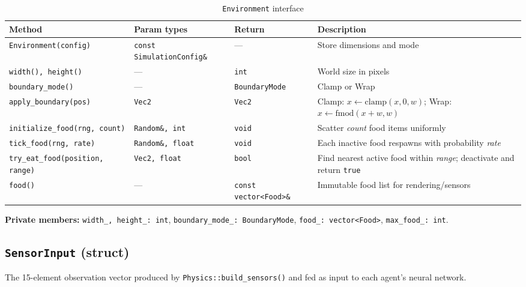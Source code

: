 \begin{table}[H]
\centering\small
\caption{\texttt{Environment} interface}
\begin{tabularx}{\textwidth}{@{}lllX@{}}
\toprule
\textbf{Method} & \textbf{Param types} & \textbf{Return} & \textbf{Description} \\
\midrule
\texttt{Environment(config)} & \texttt{const SimulationConfig\&} & — & Store dimensions and mode \\
\texttt{width(), height()} & — & \texttt{int} & World size in pixels \\
\texttt{boundary\_mode()} & — & \texttt{BoundaryMode} & Clamp or Wrap \\
\texttt{apply\_boundary(pos)} & \texttt{Vec2} & \texttt{Vec2} &
  Clamp: $x \leftarrow \text{clamp}(x, 0, w)$;
  Wrap: $x \leftarrow \text{fmod}(x+w, w)$ \\
\texttt{initialize\_food(rng, count)} & \texttt{Random\&, int} & \texttt{void} & Scatter \emph{count} food items uniformly \\
\texttt{tick\_food(rng, rate)} & \texttt{Random\&, float} & \texttt{void} & Each inactive food respawns with probability \emph{rate} \\
\texttt{try\_eat\_food(position, range)} & \texttt{Vec2, float} & \texttt{bool} & Find nearest active food within \emph{range}; deactivate and return \texttt{true} \\
\texttt{food()} & — & \texttt{const vector<Food>\&} & Immutable food list for rendering/sensors \\
\bottomrule
\end{tabularx}
\end{table}

\textbf{Private members:} \texttt{width\_, height\_: int}, \texttt{boundary\_mode\_: BoundaryMode},
\texttt{food\_: vector<Food>}, \texttt{max\_food\_: int}.

\subsection{\texttt{SensorInput} (struct)}

The 15-element observation vector produced by \texttt{Physics::build\_sensors()} and fed
as input to each agent's neural network.

